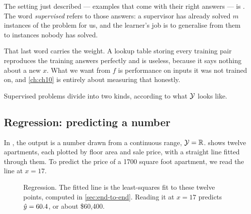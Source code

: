 The setting just described --- examples that come with their right answers --- is
. The word \emph{supervised} refers to those answers: a
supervisor has already solved $m$ instances of the problem for us, and the
learner's job is to generalise from them to instances nobody has solved.

That last word carries the weight. A lookup table storing every training pair
reproduces the training answers perfectly and is useless, because it says nothing
about a new $x$. What we want from $f$ is performance on inputs it was not
trained on, and \cref{ch:ch10} is entirely about measuring that honestly.

Supervised problems divide into two kinds, according to what $\mathcal{Y}$ looks
like.

\subsection{Regression: predicting a number}

In , the output is a number drawn from a continuous range,
$\mathcal{Y} = \mathbb{R}$.  shows twelve apartments, each plotted by
floor area and sale price, with a straight line fitted through them. To predict
the price of a 1700 square foot apartment, we read the line at $x=17$.

\begin{figure}[htbp]
  \centering
  \caption{Regression. The fitted line is the least-squares fit to these twelve
  points, computed in \cref{sec:end-to-end}. Reading it at $x=17$ predicts
  $\hat{y} = 60.4$, or about \$60{,}400.}
  \label{fig:regression}
\end{figure}

